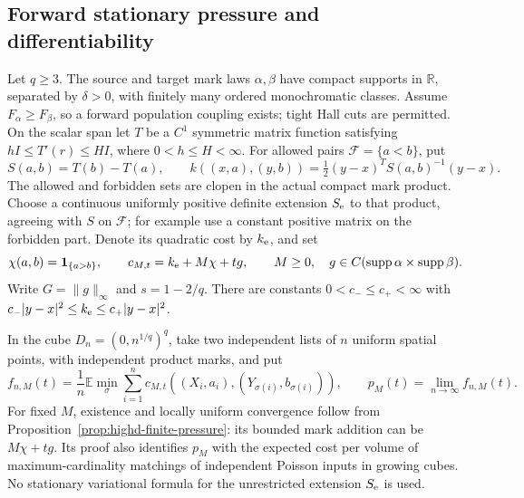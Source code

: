 \documentclass[11pt,reqno]{amsart}
\theoremstyle{definition}
\theoremstyle{remark}
\numberwithin{equation}{section}
\newcommand{\R}{\mathbb R}
\newcommand{\E}{\mathbb E}
\begin{document}
\subsection{Forward stationary pressure and differentiability}
\label{forward-full-section}

Let \(q\ge3\). The source and target mark laws \(\alpha,\beta\)
have compact supports in \(\R\), separated by \(\delta>0\), with
finitely many ordered monochromatic classes. Assume
\(F_\alpha\ge F_\beta\), so a forward population coupling exists;
tight Hall cuts are permitted. On the scalar span let \(T\) be a
\(C^1\) symmetric matrix function satisfying
\(hI\le T'(r)\le HI\), where \(0<h\le H<\infty\).
For allowed pairs \(\mathcal F=\{a<b\}\), put
\[
 S(a,b)=T(b)-T(a),\qquad
 k((x,a),(y,b))=\tfrac12(y-x)^TS(a,b)^{-1}(y-x).
\]
The allowed and forbidden sets are clopen in the actual compact mark
product. Choose a continuous uniformly positive definite extension
\(S_{\rm e}\) to that product, agreeing with \(S\) on
\(\mathcal F\); for example use a constant positive matrix on the
forbidden part. Denote its quadratic cost by \(k_{\rm e}\), and set
\[
 \chi(a,b)=\mathbf1_{\{a>b\}},\qquad
 c_{M,t}=k_{\rm e}+M\chi+t g,
 \qquad M\ge0,\quad g\in C(\operatorname{supp}\alpha
                                  \times\operatorname{supp}\beta).
\]
Write \(G=\|g\|_\infty\) and \(s=1-2/q\). There are constants
\(0<c_-\le c_+<\infty\) with
\(c_-|y-x|^2\le k_{\rm e}\le c_+|y-x|^2\).

In the cube \(D_n=(0,n^{1/q})^q\), take two independent lists of
\(n\) uniform spatial points, with independent product marks, and put
\[
 f_{n,M}(t)=\frac1n\E\min_\sigma\sum_{i=1}^n
                    c_{M,t}((X_i,a_i),(Y_{\sigma(i)},b_{\sigma(i)})),
 \qquad p_M(t)=\lim_{n\to\infty}f_{n,M}(t).
\]
For fixed \(M\), existence and locally uniform convergence follow from
Proposition~\ref{prop:highd-finite-pressure}: its bounded mark addition
can be \(M\chi+t g\). Its proof also identifies \(p_M\) with the
expected cost per volume of maximum-cardinality matchings of independent
Poisson inputs in growing cubes. No stationary variational formula for
the unrestricted extension \(S_{\rm e}\) is used.
\end{document}
